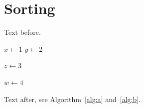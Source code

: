 \documentclass{article}
\begin{document}
\section{Sorting}
Text before.
\begin{algorithm}
\caption{Insertion sort}
\label{alg:a}
\begin{algorithmic}[1]
\State $x \gets 1$
\State $y \gets 2$
\end{algorithmic}
\end{algorithm}
\begin{algorithm}[H]
\begin{algorithmic}
\State $z \gets 3$
\end{algorithmic}
\end{algorithm}
\begin{algorithm}[H]
\caption{Here}
\label{alg:b}
\begin{algorithmic}
\State $w \gets 4$
\end{algorithmic}
\end{algorithm}
Text after, see Algorithm~\ref{alg:a} and~\ref{alg:b}.
\end{document}
